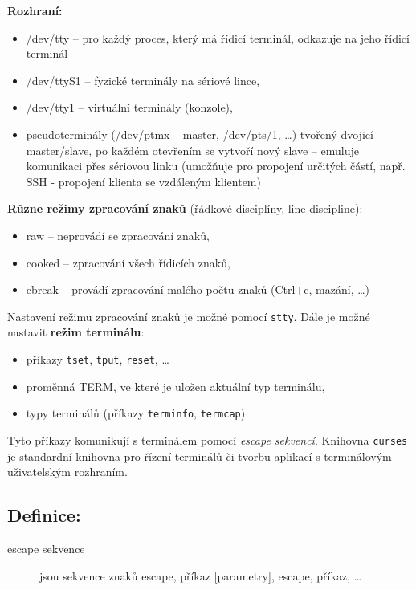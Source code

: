 \documentclass[a4paper, 11pt]{article}
\newcommand{\tcmd}[1]{\texttt{#1}}
\begin{document}
\textbf{Rozhraní:}
\begin{itemize}
    \item /dev/tty -- pro každý proces, který má řídicí terminál, odkazuje na jeho řídicí terminál
    \item /dev/ttyS1 -- fyzické terminály na sériové lince,
    \item /dev/tty1 -- virtuální terminály (konzole),
    \item pseudoterminály (/dev/ptmx -- master, /dev/pts/1, \ldots) tvořený dvojicí master/slave, po každém otevřením se vytvoří nový slave -- emuluje komunikaci přes sériovou linku (umožňuje pro propojení určitých částí, např. SSH - propojení klienta se vzdáleným klientem) \\
\end{itemize}
 
\textbf{Různe režimy zpracování znaků} (řádkové disciplíny, line discipline):
\begin{itemize}
    \item raw -- neprovádí se zpracování znaků,
    \item cooked -- zpracování všech řídicích znaků,
    \item cbreak -- provádí zpracování malého počtu znaků (Ctrl+c, mazání, \ldots)
\end{itemize}
 
Nastavení režimu zpracování znaků je možné pomocí \tcmd{stty}. Dále je možné nastavit \textbf{režim terminálu}:
\begin{itemize}
    \item příkazy \tcmd{tset}, \tcmd{tput}, \tcmd{reset}, \ldots
    \item proměnná TERM, ve které je uložen aktuální typ terminálu,
    \item typy terminálů (příkazy \tcmd{terminfo}, \tcmd{termcap})
\end{itemize}
 
Tyto příkazy komunikují s terminálem pomocí \textit{escape sekvencí}. Knihovna \texttt{curses} je standardní knihovna pro řízení terminálů či tvorbu aplikací s terminálovým uživatelským rozhraním.
 
\subsection*{Definice:}
\begin{description}
\item[escape sekvence] jsou sekvence znaků escape, příkaz [parametry], escape, příkaz, \ldots
\end{description}
\end{document}
